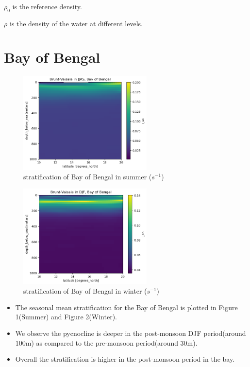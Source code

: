 \documentclass[20pt]{article}
\begin{document}
$\rho_{0}$ is the reference density. 

$\rho$ is the density of the water at different levels. 




\section*{Bay of Bengal}

\begin{figure}
    \centering
    \includegraphics[width=0.6\textwidth]{n_summer_bob.png}
    \caption{stratification of Bay of Bengal in summer ($s^{-1}$)}
\end{figure}

\begin{figure}
    \centering
    \includegraphics[width=0.6\textwidth]{n_winter_bob.png}
    \caption{stratification of Bay of Bengal in winter ($s^{-1}$)}
\end{figure}

\begin{itemize}
    \item The seasonal mean stratification for the Bay of Bengal is plotted in Figure 1(Summer) and Figure 2(Winter).
    \item We observe the pycnocline is deeper in the post-monsoon DJF period(around 100m) as compared to the pre-monsoon period(around 30m).
    \item Overall the stratification is higher in the post-monsoon period in the bay. 
\end{itemize}
\end{document}

